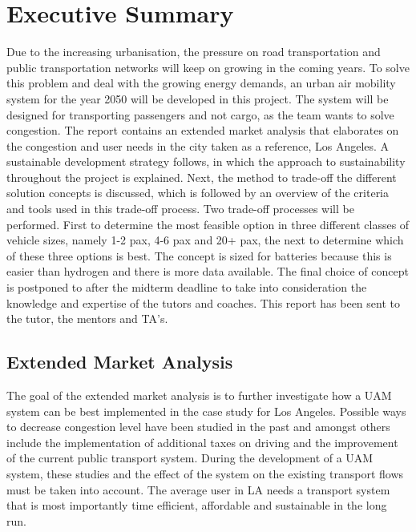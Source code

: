 \newpage
\chapter{Executive Summary}
\label{ch-ES}

Due to the increasing urbanisation, the pressure on road transportation and public transportation networks will keep on growing in the coming years. To solve this problem and deal with the growing energy demands, an urban air mobility system for the year 2050 will be developed in this project. The system will be designed for transporting passengers and not cargo, as the team wants to solve congestion. The report contains an extended market analysis that elaborates on the congestion and user needs in the city taken as a reference, Los Angeles. A sustainable development strategy follows, in which the approach to sustainability throughout the project is explained. Next, the method to trade-off the different solution concepts is discussed, which is followed by an overview of the criteria and tools used in this trade-off process. Two trade-off processes will be performed. First to determine the most feasible option in three different classes of vehicle sizes, namely 1-2 pax, 4-6 pax and 20+ pax, the next to determine which of these three options is best. The concept is sized for batteries because this is easier than hydrogen and there is more data available. The final choice of concept is postponed to after the midterm deadline to take into consideration the knowledge and expertise of the tutors and coaches. This report has been sent to the tutor, the mentors and TA's. 

\section{Extended Market Analysis}
The goal of the extended market analysis is to further investigate how a UAM system can be best implemented in the case study for Los Angeles. Possible ways to decrease congestion level have been studied in the past and amongst others include the implementation of additional taxes on driving and the improvement of the current public transport system. During the development of a UAM system, these studies and the effect of the system on the existing transport flows must be taken into account. The average user in LA needs a transport system that is most importantly time efficient, affordable and sustainable in the long run. 

